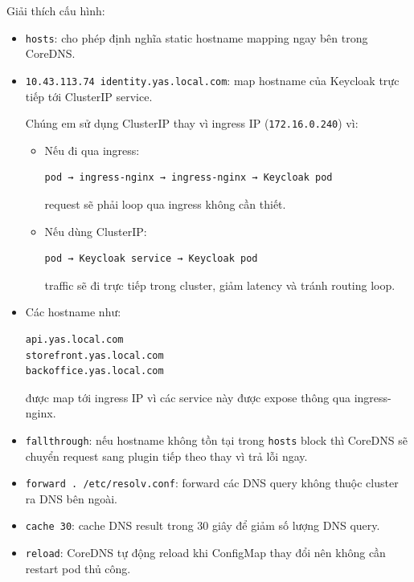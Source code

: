 Giải thích cấu hình:
\begin{itemize}
    \item \texttt{hosts}: cho phép định nghĩa static hostname mapping ngay bên trong CoreDNS.
    
    \item \texttt{10.43.113.74 identity.yas.local.com}: map hostname của Keycloak trực tiếp tới ClusterIP service.
    
    Chúng em sử dụng ClusterIP thay vì ingress IP (\texttt{172.16.0.240}) vì:
    
    \begin{itemize}
        \item Nếu đi qua ingress:
        
\begin{verbatim}
pod → ingress-nginx → ingress-nginx → Keycloak pod
\end{verbatim}

        request sẽ phải loop qua ingress không cần thiết.
        
        \item Nếu dùng ClusterIP:
        
\begin{verbatim}
pod → Keycloak service → Keycloak pod
\end{verbatim}

        traffic sẽ đi trực tiếp trong cluster, giảm latency và tránh routing loop.
    \end{itemize}
    
    \item Các hostname như:
    
\begin{verbatim}
api.yas.local.com
storefront.yas.local.com
backoffice.yas.local.com
\end{verbatim}

    được map tới ingress IP vì các service này được expose thông qua ingress-nginx.
    
    \item \texttt{fallthrough}: nếu hostname không tồn tại trong \texttt{hosts} block thì CoreDNS sẽ chuyển request sang plugin tiếp theo thay vì trả lỗi ngay.
    
    \item \texttt{forward . /etc/resolv.conf}: forward các DNS query không thuộc cluster ra DNS bên ngoài.
    
    \item \texttt{cache 30}: cache DNS result trong 30 giây để giảm số lượng DNS query.
    
    \item \texttt{reload}: CoreDNS tự động reload khi ConfigMap thay đổi nên không cần restart pod thủ công.
\end{itemize}

